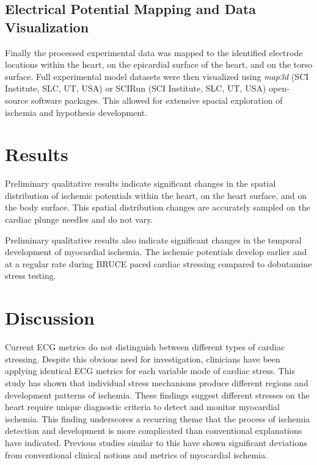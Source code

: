 \documentclass[twocolumn]{cinc}
\newcommand{\mapthreed}{\textit{map3d }}
\begin{document}
\subsection{Electrical Potential Mapping and Data Visualization}

Finally the processed experimental data was mapped to the identified electrode locations within the heart, on the epicardial surface of the heart, and on the torso surface. Full experimental model datasets were then visualized using \mapthreed (SCI Institute, SLC, UT, USA) or SCIRun (SCI Institute, SLC, UT, USA) open-source software packages. This allowed for extensive spacial exploration of ischemia and hypothesis development. 

\section{Results}

Preliminary qualitative results indicate significant changes in the spatial distribution of ischemic potentials within the heart, on the heart surface, and on the body surface. This spatial distribution changes are accurately sampled on the cardiac plunge needles and do not vary. 

Preliminary qualitative results also indicate significant changes in the temporal development of myocardial ischemia. The ischemic potentials develop earlier and at a regular rate during BRUCE paced cardiac stressing compared to dobutamine stress testing. 

\section{Discussion}

Current ECG metrics do not distinguish between different types of cardiac stressing. Despite this obvious need for investigation, clinicians have been applying identical ECG metrics for each variable mode of cardiac stress. This study has shown that individual stress mechanisms produce different regions and development patterns of ischemia. These findings suggest different stresses on the heart require unique diagnostic criteria to detect and monitor myocardial ischemia. This finding underscores a recurring theme that the process of ischemia detection and development is more complicated than conventional explanations have indicated. Previous studies similar to this have shown significant deviations from conventional clinical notions and metrics of myocardial ischemia. 
\end{document}
